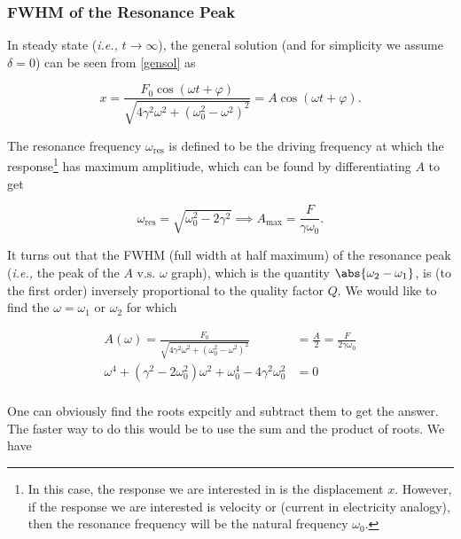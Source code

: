 \documentclass[english,a4paper,12pt]{report}
\begin{document}
\subsubsection{FWHM of the Resonance Peak}

In steady state (\textit{i.e.,} \(t \to \infty\)), the general solution (and for simplicity we assume \(\delta = 0\)) can be seen from \cref{gensol} as 

\begin{equation}
    x = \frac{F_0 \cos  (\omega t+\varphi )}{\sqrt{4\gamma ^2\omega ^2+ (\omega _{0}^2 - \omega ^2 )^2} } = A \cos (\omega t+\varphi ).
\end{equation}

The resonance frequency \(\omega _{\text{res} } \) is defined to be the driving frequency at which the response\footnote{In this case, the response we are interested in is the displacement \(x\). However, if the response we are interested is velocity or (current in electricity analogy), then the resonance frequency will be the natural frequency \(\omega _{0} \).} has maximum amplitiude, which can be found by differentiating \(A\) to get

\begin{equation}
    \omega _{\text{res} } = \sqrt{\omega _{0}^2 - 2\gamma ^2 } \implies A_{\text{max} } = \frac{F}{\gamma \omega _{0} }.  
\end{equation}

It turns out that the FWHM (full width at half maximum) of the resonance peak (\textit{i.e.,} the peak of the \(A \text{ v.s. } \omega  \) graph), which is the quantity \(\abs{\omega _{2} - \omega _{1} } \), is (to the first order) inversely proportional to the quality factor \(Q\). We would like to find the \(\omega = \omega _{1}\text { or } \omega _{2}  \) for which 

\begin{equation}
    \begin{aligned} 
    A(\omega ) = \frac{F_0 }{\sqrt{4\gamma ^2\omega  ^2+ (\omega _{0}^2 - \omega  ^2 )^2} } &= \frac{A}{2} = \frac{F}{2\gamma \omega _{0} } \\
    \omega ^{4} + (\gamma ^2 - 2\omega _{0}^2 ) \omega ^2+\omega _{0}^{4} - 4\gamma ^2\omega _{0}^2 &= 0\\    
    \end{aligned} 
\end{equation}

One can obviously find the roots expcitly and subtract them to get the answer. The faster way to do this would be to use the sum and the product of roots. We have
\end{document}
